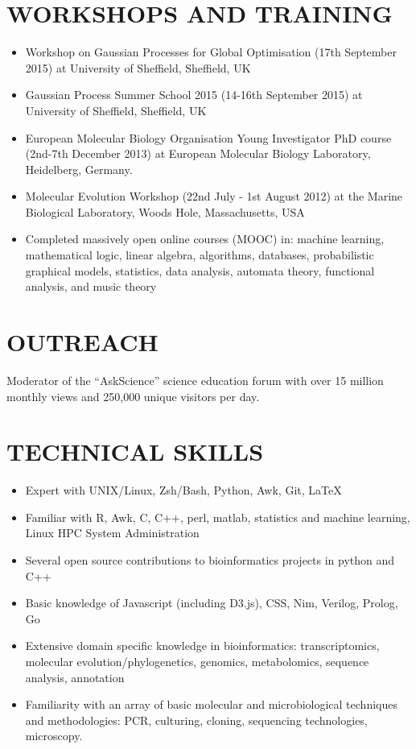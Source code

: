 \documentclass{res}
\begin{document}
\begin{resume}
  \section{WORKSHOPS AND TRAINING}
  \begin{itemize}
          \vspace{-1pt}
      \item Workshop on Gaussian Processes for Global Optimisation (17th September 2015) at University of Sheffield, Sheffield, UK
      \item Gaussian Process Summer School 2015 (14-16th September 2015) at University of Sheffield, Sheffield, UK
      \item European Molecular Biology Organisation Young Investigator PhD course (2nd-7th December 2013) at European Molecular Biology Laboratory, Heidelberg, Germany.
\item Molecular Evolution Workshop (22nd July - 1st August 2012)
    at the Marine Biological Laboratory, Woods Hole, Massachusetts, USA
  \item Completed massively open online courses (MOOC) in: machine learning, mathematical logic, linear algebra, algorithms, databases, probabilistic graphical models, statistics, data analysis, automata theory, 
         functional analysis, and music theory
\end{itemize}
  

 \section{OUTREACH}          
 \vspace{5pt}
Moderator of the ``AskScience'' science education forum with over 15 million monthly views and 250,000 unique visitors per day.
\vspace{-5pt}


 \section{TECHNICAL SKILLS}
          \vspace{-1pt}
 \begin{itemize}
\item Expert with UNIX/Linux, Zsh/Bash, Python, Awk, Git, \LaTeX
\item Familiar with R, Awk, C, C++, perl, matlab, statistics and machine learning, Linux HPC System Administration 
\item Several open source contributions to bioinformatics projects in python and C++ 
\item Basic knowledge of Javascript (including D3.js), CSS, Nim, Verilog, Prolog, Go
\item Extensive domain specific knowledge in bioinformatics: transcriptomics, molecular evolution/phylogenetics, genomics, metabolomics, sequence analysis, annotation
\item Familiarity with an array of basic molecular and microbiological techniques and methodologies: PCR, culturing, cloning, sequencing technologies, microscopy.
     

\end{itemize}
\end{resume}
\end{document}
